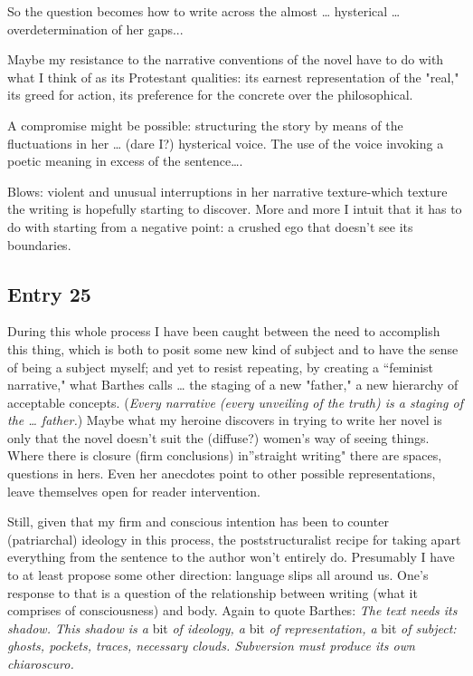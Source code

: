 \documentclass[
]{memoir}
\begin{document}
So the question becomes how to write across the almost \ldots{}
hysterical \ldots{} overdetermination of her gaps...

Maybe my resistance to the narrative conventions of the novel have to do
with what I think of as its Protestant qualities: its earnest
representation of the "real," its greed for action, its preference for
the concrete over the philosophical.

A compromise might be possible: structuring the story by means of the
fluctuations in her \ldots{} (dare I?) hysterical voice. The use of the
voice invoking a poetic meaning in excess of the sentence\ldots{}.

Blows: violent and unusual interruptions in her narrative texture-which
texture the writing is hopefully starting to discover. More and more I
intuit that it has to do with starting from a negative point: a crushed
ego that doesn't see its boundaries.

\hypertarget{entry-25}{%
\subsection*{Entry 25}\label{entry-25}}

During this whole process I have been caught between the need to
accomplish this thing, which is both to posit some new kind of subject
and to have the sense of being a subject myself; and yet to resist
repeating, by creating a ``feminist narrative," what Barthes calls
\ldots{} the staging of a new "father," a new hierarchy of acceptable
concepts. (\emph{Every narrative (every unveiling of the truth) is a
staging of the \ldots{} father.}) Maybe what my heroine discovers in
trying to write her novel is only that the novel doesn't suit the
(diffuse?) women's way of seeing things. Where there is closure (firm
conclusions) in''straight writing" there are spaces, questions in hers.
Even her anecdotes point to other possible representations, leave
themselves open for reader intervention.

Still, given that my firm and conscious intention has been to counter
(patriarchal) ideology in this process, the poststructuralist recipe for
taking apart everything from the sentence to the author won't entirely
do. Presumably I have to at least propose some other direction: language
slips all around us. One's response to that is a question of the
relationship between writing (what it comprises of consciousness) and
body. Again to quote Barthes: \emph{The text needs its shadow. This
shadow is a} bit \emph{of ideology, a} bit \emph{of representation, a}
bit \emph{of subject: ghosts, pockets, traces, necessary clouds.
Subversion must produce its own chiaroscuro.}
\end{document}
